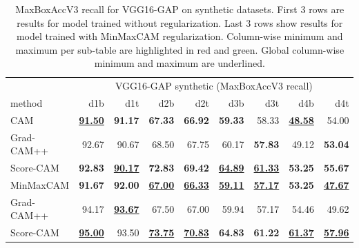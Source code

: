 \begin{table}[h]
\centering
\begin{tabular}{lrrrrrrrr}
\toprule
& \multicolumn{8}{c}{VGG16-GAP synthetic (MaxBoxAccV3 recall)} \\
method & d1b & d1t & d2b & d2t & d3b & d3t & d4b & d4t \\
\cmidrule(lr){1-1} \cmidrule(lr){2-9} 
CAM & \color{purple} \bfseries  \underline{91.50} & \color{teal} \bfseries 91.17 & \color{purple} \bfseries 67.33 & \color{purple} \bfseries 66.92 & \color{purple} \bfseries 59.33 & 58.33 & \color{purple} \bfseries \underline{48.58} & 54.00 \\
Grad-CAM++ & 92.67 & 90.67 & 68.50 & 67.75 & 60.17 & \color{purple} \bfseries 57.83 & 49.12 & \color{purple} \bfseries 53.04 \\
Score-CAM & \color{teal} \bfseries 92.83 & \color{purple} \bfseries \underline{90.17} & \color{teal} \bfseries 72.83 & \color{teal} \bfseries 69.42 & \color{teal} \bfseries \underline{64.89} & \color{teal} \bfseries \underline{61.33} & \color{teal} \bfseries 53.25 & \color{teal} \bfseries 55.67 \\
\cmidrule(lr){1-1} \cmidrule(lr){2-9} 
MinMaxCAM & \color{purple} \bfseries 91.67 & \color{purple} \bfseries 92.00 & \color{purple} \bfseries \underline{67.00} & \color{purple} \bfseries \underline{66.33} & \color{purple} \bfseries \underline{59.11} & \color{purple} \bfseries \underline{57.17} & \color{purple} \bfseries 53.25 & \color{purple} \bfseries \underline{47.67} \\
Grad-CAM++ & 94.17 & \color{teal} \bfseries \underline{93.67} & 67.50 & 67.00 & 59.94 & 57.17 & 54.46 & 49.62 \\
Score-CAM & \color{teal} \bfseries \underline{95.00} & 93.50 & \color{teal} \bfseries \underline{73.75} & \color{teal} \bfseries \underline{70.83} & \color{teal} \bfseries 64.83 & \color{teal} \bfseries 61.22 & \color{teal} \bfseries \underline{61.37} & \color{teal} \bfseries \underline{57.96} \\
\bottomrule
\end{tabular}
\caption[MaxBoxAccV3 for VGG16-GAP on synthetic datasets]{MaxBoxAccV3 recall for VGG16-GAP on synthetic datasets. First 3 rows are results for model trained without regularization. Last 3 rows show results for model trained with MinMaxCAM regularization. Column-wise minimum and maximum per sub-table are highlighted in red and green. Global column-wise minimum and maximum are underlined.}
\label{tab:maxboxaccv3_recall_vgg16_gap_synthetic}
\end{table}

